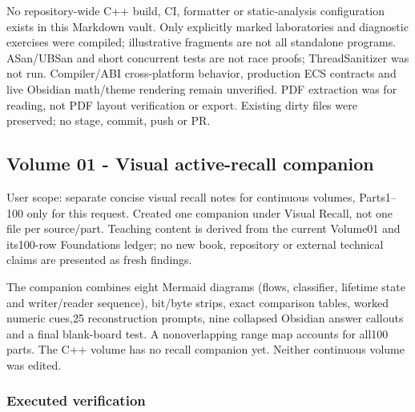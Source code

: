\hypertarget{appendix-a103e7846d21-verification-limits}{}

No repository-wide C++ build, CI, formatter or static-analysis configuration exists in this Markdown vault. Only explicitly marked laboratories and diagnostic exercises were compiled; illustrative fragments are not all standalone programs. ASan/UBSan and short concurrent tests are not race proofs; ThreadSanitizer was not run. Compiler/ABI cross-platform behavior, production ECS contracts and live Obsidian math/theme rendering remain unverified. PDF extraction was for reading, not PDF layout verification or export. Existing dirty files were preserved; no stage, commit, push or PR.

\subsection{Volume 01 - Visual active-recall companion}\label{appendix-a103e7846d21-volume-01---visual-active-recall-companion}

\hypertarget{appendix-a103e7846d21-volume-01---visual-active-recall-companion}{}

User scope: separate concise visual recall notes for continuous volumes, Parts1--100 only for this request. Created one companion under Visual Recall, not one file per source/part. Teaching content is derived from the current Volume01 and its100-row Foundations ledger; no new book, repository or external technical claims are presented as fresh findings.

The companion combines eight Mermaid diagrams (flows, classifier, lifetime state and writer/reader sequence), bit/byte strips, exact comparison tables, worked numeric cues,25 reconstruction prompts, nine collapsed Obsidian answer callouts and a final blank-board test. A nonoverlapping range map accounts for all100 parts. The C++ volume has no recall companion yet. Neither continuous volume was edited.

\subsubsection{Executed verification}\label{appendix-a103e7846d21-executed-verification}

\hypertarget{appendix-a103e7846d21-executed-verification}{}

